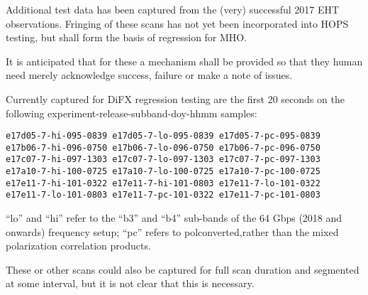 Additional test data has been captured from the (very) successful
2017 \ac{EHT} observations.  Fringing of these scans has not yet
been incorporated into \ac{HOPS} testing, but shall form the basis
of regression for \ac{MHO}.  \FIXME[elaborate]

It is anticipated that for these a mechanism shall be provided
so that they human need merely acknowledge success, failure or
make a note of issues.

Currently captured for \acs{DiFX} regression testing are the first 20 seconds
on the following experiment-release-subband-doy-hhmm samples:
\begin{verbatim}
e17d05-7-hi-095-0839 e17d05-7-lo-095-0839 e17d05-7-pc-095-0839
e17b06-7-hi-096-0750 e17b06-7-lo-096-0750 e17b06-7-pc-096-0750
e17c07-7-hi-097-1303 e17c07-7-lo-097-1303 e17c07-7-pc-097-1303
e17a10-7-hi-100-0725 e17a10-7-lo-100-0725 e17a10-7-pc-100-0725
e17e11-7-hi-101-0322 e17e11-7-hi-101-0803 e17e11-7-lo-101-0322
e17e11-7-lo-101-0803 e17e11-7-pc-101-0322 e17e11-7-pc-101-0803
\end{verbatim}
``lo'' and ``hi'' refer to the ``b3'' and ``b4'' sub-bands of the
64 \acs{Gbps} (2018 and onwards) frequency setup; ``pc'' refers to polconverted,rather than the mixed polarization correlation products.

\TBC{}

These or other scans could also be captured for full scan duration and
segmented at some interval, but it is not clear that this is necessary.









%
%
%

